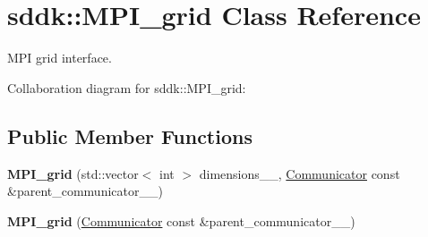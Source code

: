 \hypertarget{classsddk_1_1_m_p_i__grid}{}\section{sddk\+:\+:M\+P\+I\+\_\+grid Class Reference}
\label{classsddk_1_1_m_p_i__grid}


M\+P\+I grid interface.  




Collaboration diagram for sddk\+:\+:M\+P\+I\+\_\+grid\+:
\subsection*{Public Member Functions}
\begin{DoxyCompactItemize}
\item 
\hypertarget{classsddk_1_1_m_p_i__grid_a059fe9c435817d5a7349fb55c49f6f44}{}{\bfseries M\+P\+I\+\_\+grid} (std\+::vector$<$ int $>$ dimensions\+\_\+\+\_\+, \hyperlink{classsddk_1_1_communicator}{Communicator} const \&parent\+\_\+communicator\+\_\+\+\_\+)\label{classsddk_1_1_m_p_i__grid_a059fe9c435817d5a7349fb55c49f6f44}

\item 
\hypertarget{classsddk_1_1_m_p_i__grid_aca2a78e0fc3d72168b8ace7df049247e}{}{\bfseries M\+P\+I\+\_\+grid} (\hyperlink{classsddk_1_1_communicator}{Communicator} const \&parent\+\_\+communicator\+\_\+\+\_\+)\label{classsddk_1_1_m_p_i__grid_aca2a78e0fc3d72168b8ace7df049247e}


\end{DoxyCompactItemize}
